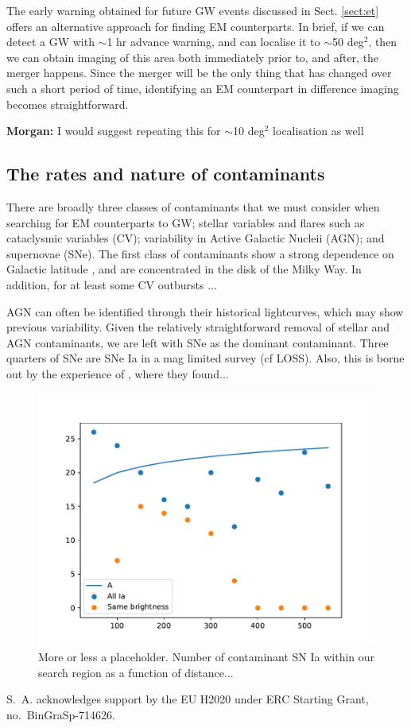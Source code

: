\documentclass{aa}
\begin{document}
The early warning obtained for future GW events discussed in Sect. \ref{sect:et} offers an alternative approach for finding EM counterparts. In brief, if we can detect a GW with $\sim$1 hr advance warning, and can localise it to $\sim$50 deg$^2$, then we can obtain imaging of this area both immediately prior to, and after, the merger happens. Since the merger will be the only thing that has changed over such a short period of time, identifying an EM counterpart in difference imaging becomes straightforward.

{\bf Morgan:} I would suggest repeating this for $\sim$10 deg$^2$ localisation as well

\subsection{The rates and nature of contaminants}

There are broadly three classes of contaminants that we must consider when searching for EM counterparts to GW; stellar variables and flares such as cataclysmic variables (CV); variability in Active Galactic Nucleii (AGN); and supernovae (SNe). The first class of contaminants show a strong dependence on Galactic latitude \citep{Drak14}, and are concentrated in the disk of the Milky Way. In addition, for at least some CV outbursts ...

AGN can often be identified through their historical lightcurves, which may show previous variability. Given the relatively straightforward removal of stellar and AGN contaminants, we are left with SNe as the dominant contaminant. Three quarters of SNe are SNe Ia in a mag limited survey (cf LOSS). Also, this is borne out by the experience of \cite{Smar16}, where they found...




\begin{figure}[h]
\includegraphics[width=\linewidth]{plot.pdf}
\caption{More or less a placeholder. Number of contaminant SN Ia within our search region as a function of distance...
}
\label{fig:SNIa}
\end{figure}




\begin{acknowledgements}
 S.~A. acknowledges support by the EU H2020 under ERC Starting Grant, no.~BinGraSp-714626.
\end{acknowledgements}




\end{document}
